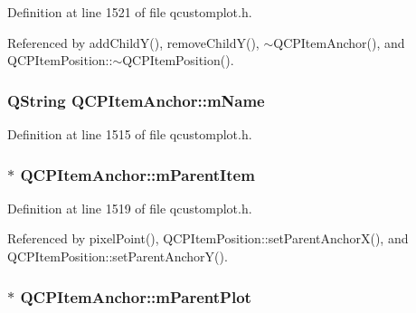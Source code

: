 Definition at line 1521 of file qcustomplot.\+h.



Referenced by add\+Child\+Y(), remove\+Child\+Y(), $\sim$\+Q\+C\+P\+Item\+Anchor(), and Q\+C\+P\+Item\+Position\+::$\sim$\+Q\+C\+P\+Item\+Position().

\hypertarget{class_q_c_p_item_anchor_a23ad4d0ab0d2cbb41a7baf05bcf996ec}{}
\subsubsection[{m\+Name}]{\setlength{\rightskip}{0pt plus 5cm}Q\+String Q\+C\+P\+Item\+Anchor\+::m\+Name\hspace{0.3cm}{\ttfamily [protected]}}\label{class_q_c_p_item_anchor_a23ad4d0ab0d2cbb41a7baf05bcf996ec}


Definition at line 1515 of file qcustomplot.\+h.

\hypertarget{class_q_c_p_item_anchor_a80fad480ad3bb980446ed6ebc00818ae}{}
\subsubsection[{m\+Parent\+Item}]{$\ast$ Q\+C\+P\+Item\+Anchor\+::m\+Parent\+Item\hspace{0.3cm}{\ttfamily [protected]}}\label{class_q_c_p_item_anchor_a80fad480ad3bb980446ed6ebc00818ae}


Definition at line 1519 of file qcustomplot.\+h.



Referenced by pixel\+Point(), Q\+C\+P\+Item\+Position\+::set\+Parent\+Anchor\+X(), and Q\+C\+P\+Item\+Position\+::set\+Parent\+Anchor\+Y().

\hypertarget{class_q_c_p_item_anchor_a59b968410831ba91a25cc75a77dde6f5}{}
\subsubsection[{m\+Parent\+Plot}]{$\ast$ Q\+C\+P\+Item\+Anchor\+::m\+Parent\+Plot\hspace{0.3cm}{\ttfamily [protected]}}\label{class_q_c_p_item_anchor_a59b968410831ba91a25cc75a77dde6f5}


